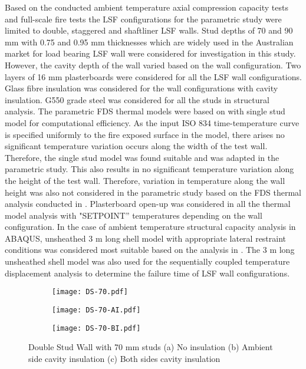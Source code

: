 Based on the conducted ambient temperature axial compression capacity tests and full-scale fire tests the LSF configurations for the parametric study were limited to double, staggered and shaftliner LSF walls. Stud depths of 70 and 90 mm with 0.75 and 0.95 mm thicknesses which are widely used in the Australian market for load bearing LSF wall were considered for investigation in this study. However, the cavity depth of the wall varied based on the wall configuration. Two layers of 16 mm plasterboards were considered for all the LSF wall configurations. Glass fibre insulation was considered for the wall configurations with cavity insulation. G550 grade steel was considered for all the studs in structural analysis. The parametric FDS thermal models were based on with single stud model for computational efficiency. As the input ISO 834 time-temperature curve is specified uniformly to the fire exposed surface in the model, there arises no significant temperature variation occurs along the width of the test wall. Therefore, the single stud model was found suitable and was adapted in the parametric study. This also results in no significant temperature variation along the height of the test wall. Therefore, variation in temperature along the wall height was also not considered in the parametric study based on the FDS thermal analysis conducted in . Plasterboard open-up was considered in all the thermal model analysis with "SETPOINT'' temperatures depending on the wall configuration. In the case of ambient temperature structural capacity analysis in ABAQUS, unsheathed 3 m long shell model with appropriate lateral restraint conditions was considered most suitable based on the analysis in . The 3 m long unsheathed shell model was also used for the sequentially coupled temperature displacement analysis to determine the failure time of LSF wall configurations.
\begin{figure}[!htbp]
	\centering
	\begin{subfigure}[b]{0.2\textwidth}
		\centering
		\texttt{[image: DS-70.pdf]}
		\caption{}
		\label{subfig:DS-70}
	\end{subfigure}
	\begin{subfigure}[b]{0.2\textwidth}
		\centering
		\texttt{[image: DS-70-AI.pdf]}
		\caption{}
		\label{subfig:DS-70-AI}
	\end{subfigure}
	\begin{subfigure}[b]{0.2\textwidth}
		\centering
		\texttt{[image: DS-70-BI.pdf]}
		\caption{}
		\label{subfig:DS-70-BI}
	\end{subfigure}
	   \caption{Double Stud Wall with 70 mm studs (a) No insulation (b) Ambient side cavity insulation (c) Both sides cavity insulation}
	   \label{fig:DS-70-parametric}
\end{figure} 
